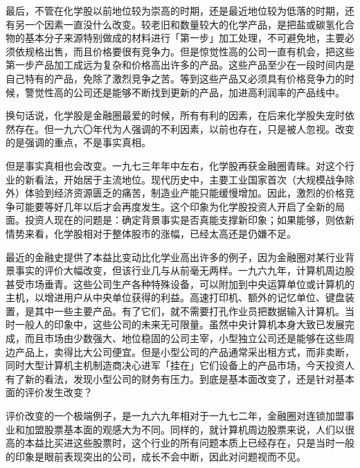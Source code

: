 \documentclass[UTF8,a4paper,zihao=-4,fontset = windows]{ctexart} %
\begin{document}
最后，不管在化学股以前地位较为崇高的时期，还是最近地位较为低落的时期，还有另一个因素一直没什么改变。较老旧和数量较大的化学产品，是把盐或碳氢化合物的基本分子来源特别做成的材料进行「第一步」加工处理，不可避免地，主要必须依规格出售，而且价格要很有竞争力。但是惊觉性高的公司一直有机会，把这些第一步产品加工成远为复杂和价格高出许多的产品。这些产品至少在一段时间内是自己特有的产品，免除了激烈竞争之苦。等到这些产品又必须具有价格竞争力的时候，警觉性高的公司还是能够不断找到更新的产品，加进高利润率的产品线中。

换句话说，化学股是金融圈最爱的时候，所有有利的因素，在后来化学股失宠时依然存在。但一九六〇年代为人强调的不利因素，以前也存在，只是被人忽视。改变的是强调的重点，不是事实真相。

但是事实真相也会改变。一九七三年年中左右，化学股再获金融圈青睐。对这个行业的新看法，开始居于主流地位。现代历史中，主要工业国家首次（大规模战争除外）体验到经济资源匮乏的痛苦，制造业产能只能缓慢增加。因此，激烈的价格竞争可能要等好几年以后才会再度发生。这个印象为化学股投资人开启了全新的局面。投资人现在的问题是：确定背景事实是否真能支撑新印象；如果能够，则依新情势来看，化学股相对于整体股市的涨幅，已经太高还是仍嫌不足。

最近的金融史提供了本益比变动比化学业高出许多的例子，因为金融圈对某行业背景事实的评价大幅改变，但该行业几与从前毫无两样。一九六九年，计算机周边股甚受市场垂青。这些公司生产各种特殊设备，可以附加到中央运算单位或计算机的主机，以增进用户从中央单位获得的利益。高速打印机、额外的记忆单位、键盘装置，是其中一些主要产品。有了它们，就不需要打孔作业员把数据输入计算机。当时一般人的印象中，这些公司的未来无可限量。虽然中央计算机本身大致已发展完成，而且市场由少数强大、地位稳固的公司主宰，小型独立公司还是能够在这些周边产品上，卖得比大公司便宜。但是小型公司的产品通常采出租方式，而非卖断，同时大型计算机主机制造商决心进军「挂在」它们设备上的产品市场，今天投资人有了新的看法，发现小型公司的财务有压力。到底是基本面改变了，还是针对基本面的评价发生改变？

评价改变的一个极端例子，是一九六九年相对于一九七二年，金融圈对连锁加盟事业和加盟股票基本面的观感大为不同。同样的，就计算机周边股票来说，人们以很高的本益比买进这些股票时，这个行业的所有问题本质上已经存在，只是当时一般的印象是眼前表现突出的公司，成长不会中断，因此对问题视而不见。
\end{document}

